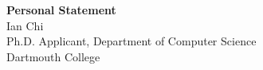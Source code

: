 \documentclass[11pt]{article}
\begin{document}
\begin{center}
    {\Large \textbf{Personal Statement}}\\[4pt]
    {\large Ian Chi}\\[2pt]
    Ph.D. Applicant, Department of Computer Science\\
    Dartmouth College
\end{center}

\vspace{1em}

\end{document}
